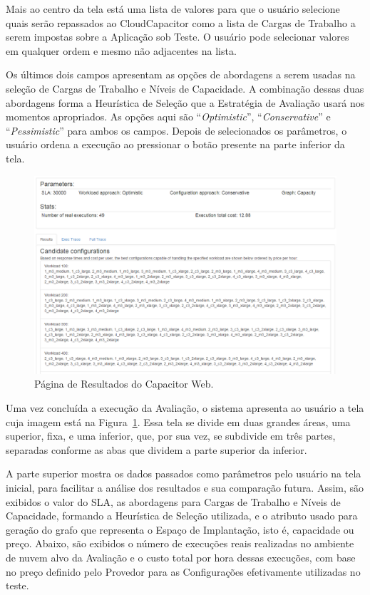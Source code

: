 Mais ao centro da tela está uma lista de valores para que o usuário selecione quais 
serão repassados ao CloudCapacitor como a lista de Cargas de Trabalho a serem impostas
sobre a Aplicação sob Teste. O usuário pode selecionar valores em qualquer ordem e mesmo
não adjacentes na lista.

Os últimos dois campos apresentam as opções de abordagens a serem usadas na seleção de
Cargas de Trabalho e Níveis de Capacidade. A combinação dessas duas abordagens forma a
Heurística de Seleção que a Estratégia de Avaliação usará nos momentos apropriados. As 
opções aqui são ``\emph{Optimistic}'', ``\emph{Conservative}'' e ``\emph{Pessimistic}''
para ambos os campos. Depois de selecionados os parâmetros, o usuário ordena a execução 
ao pressionar o botão presente na parte inferior da tela.

\begin{figure}[t]
  \begin{center}
    \includegraphics[width=\linewidth]{img/CapacitorWeb_Results}
  \end{center}
  \caption{\label{fig:capacitor_web_results}Página de Resultados do Capacitor Web.}
\end{figure}

Uma vez concluída a execução da Avaliação, o sistema apresenta ao usuário a tela
cuja imagem está na Figura~\ref{fig:capacitor_web_results}. Essa tela se divide
em duas grandes áreas, uma superior, fixa, e uma inferior, que, por sua vez, 
se subdivide em três partes, separadas conforme as abas que dividem a parte 
superior da inferior.

A parte superior mostra os dados passados como parâmetros pelo usuário na tela
inicial, para facilitar a análise dos resultados e sua comparação futura. Assim,
são exibidos o valor do SLA, as abordagens para Cargas de Trabalho e Níveis de 
Capacidade, formando a Heurística de Seleção utilizada, e o atributo usado para
geração do grafo que representa o Espaço de Implantação, isto é, capacidade ou
preço. Abaixo, são exibidos o número de execuções reais realizadas no ambiente
de nuvem alvo da Avaliação e o custo total por hora dessas execuções, com base
no preço definido pelo Provedor para as Configurações efetivamente utilizadas no 
teste. 
 
